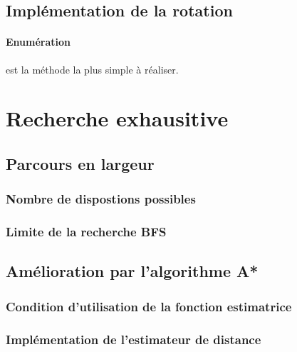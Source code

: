 \documentclass{article}
\begin{document}
\paragraph{}
\subsection{Implémentation de la rotation} 
\paragraph{Enumération} est la méthode la plus simple à réaliser. 

\section{Recherche exhausitive}
\subsection{Parcours en largeur}
\subsubsection{Nombre de dispostions possibles}
\paragraph{}
\subsubsection{Limite de la recherche BFS}
\paragraph{}
\subsection{Amélioration par l’algorithme A*}
\subsubsection{Condition d’utilisation de la fonction estimatrice}
\paragraph{}
\subsubsection{Implémentation de l’estimateur de distance}
\end{document}
